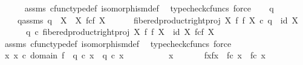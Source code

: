 \begin{isabellebody}
\ \ \ \ \isamarkupfalse%
\ assms{\isacharparenleft}{\kern0pt}{}{\isacharcomma}{\kern0pt}{}{\isacharparenright}{\kern0pt}\ cfunc{\isacharunderscore}{\kern0pt}type{\isacharunderscore}{\kern0pt}def\ isomorphism{\isacharunderscore}{\kern0pt}def\ \isamarkupfalse%
\ {\isacharparenleft}{\kern0pt}typecheck{\isacharunderscore}{\kern0pt}cfuncs{\isacharcomma}{\kern0pt}\ force{\isacharparenright}{\kern0pt}\isanewline
\isanewline
\ \ \isamarkupfalse%
\ q{}\ \ \isanewline
\ \ \ \ q{}{\isacharunderscore}{\kern0pt}assms{\isacharcolon}{\kern0pt}\ {\isachardoublequoteopen}q{}\ {\isacharcolon}{\kern0pt}\ X\ {\isasymrightarrow}\ X\ \isactrlbsub f\isactrlesub {\isasymtimes}\isactrlsub c\isactrlbsub f\isactrlesub \ X{\isachardoublequoteclose}\isanewline
\ \ \ \ \ \ {\isachardoublequoteopen}fibered{\isacharunderscore}{\kern0pt}product{\isacharunderscore}{\kern0pt}right{\isacharunderscore}{\kern0pt}proj\ X\ f\ f\ X\ {\isasymcirc}\isactrlsub c\ q{}\ {\isacharequal}{\kern0pt}\ id\ X{\isachardoublequoteclose}\isanewline
\ \ \ \ \ \ {\isachardoublequoteopen}q{}\ {\isasymcirc}\isactrlsub c\ fibered{\isacharunderscore}{\kern0pt}product{\isacharunderscore}{\kern0pt}right{\isacharunderscore}{\kern0pt}proj\ X\ f\ f\ X\ {\isacharequal}{\kern0pt}\ id\ {\isacharparenleft}{\kern0pt}X\ \isactrlbsub f\isactrlesub {\isasymtimes}\isactrlsub c\isactrlbsub f\isactrlesub \ X{\isacharparenright}{\kern0pt}{\isachardoublequoteclose}\isanewline
\ \ \ \ \isamarkupfalse%
\ assms{\isacharparenleft}{\kern0pt}{}{\isacharcomma}{\kern0pt}{}{\isacharparenright}{\kern0pt}\ cfunc{\isacharunderscore}{\kern0pt}type{\isacharunderscore}{\kern0pt}def\ isomorphism{\isacharunderscore}{\kern0pt}def\ \isamarkupfalse%
\ {\isacharparenleft}{\kern0pt}typecheck{\isacharunderscore}{\kern0pt}cfuncs{\isacharcomma}{\kern0pt}\ force{\isacharparenright}{\kern0pt}\isanewline
\isanewline
\ \ \isamarkupfalse%
\ {\isachardoublequoteopen}{\isasymAnd}x{\isachardot}{\kern0pt}\ x\ {\isasymin}\isactrlsub c\ domain\ f\ {\isasymLongrightarrow}\ q{}\ {\isasymcirc}\isactrlsub c\ x\ {\isacharequal}{\kern0pt}\ q{}\ {\isasymcirc}\isactrlsub c\ x{\isachardoublequoteclose}\isanewline
\ \ \isamarkupfalse%
\ {\isacharminus}{\kern0pt}\isanewline
\ \ \ \ \isamarkupfalse%
\ x\ \isanewline
\ \ \ \ \isamarkupfalse%
\ fxfx{\isacharcolon}{\kern0pt}\ \ {\isachardoublequoteopen}f{\isasymcirc}\isactrlsub c\ x\ {\isacharequal}{\kern0pt}\ f{\isasymcirc}\isactrlsub c\ x{\isachardoublequoteclose}\isanewline

\end{isabellebody}
